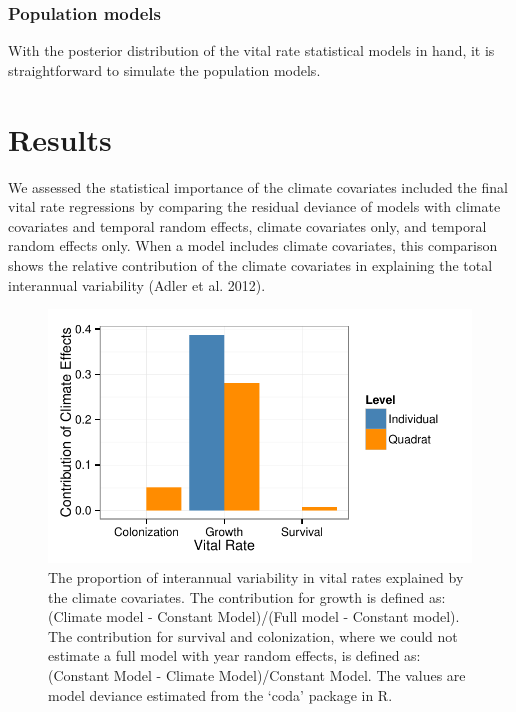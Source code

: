 \documentclass[12pt]{article}
\begin{document}
\subsubsection{Population models}
With the posterior distribution of the vital rate statistical models in hand, it is straightforward to simulate the population models.

\section{Results}
We assessed the statistical importance of the climate covariates included the final vital rate regressions by comparing the residual deviance of models with climate covariates and temporal random effects, climate covariates only, and temporal random effects only. When a model includes climate covariates, this comparison shows the relative contribution of the climate covariates in explaining the total interannual variability (Adler et al. 2012). 



\begin{figure}[th!]
\begin{center}
\includegraphics{Fig-ClimFig}
\end{center}
\caption{The proportion of interannual variability in  vital rates explained by the climate covariates. The contribution for growth is defined as: (Climate model - Constant Model)/(Full model - Constant model). The contribution for survival and colonization, where we could not estimate a full model with year random effects, is defined as: (Constant Model - Climate Model)/Constant Model. The values are model deviance estimated from the `coda' package in R.}
\label{fig:ClimFig}
\end{figure}
\end{document}
